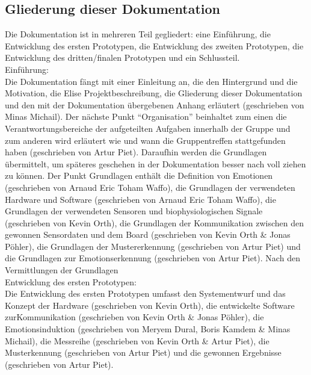 \subsection{Gliederung dieser Dokumentation} \label{gliederung-subsec}



Die Dokumentation ist in mehreren Teil gegliedert: eine Einführung, die Entwicklung des ersten Prototypen, die Entwicklung des zweiten Prototypen, die Entwicklung des dritten/finalen Prototypen und ein Schlussteil. \\

Einführung: \\

Die Dokumentation fängt mit einer Einleitung an, die den Hintergrund und die Motivation, die Elise Projektbeschreibung, die Gliederung dieser Dokumentation und den mit der Dokumentation übergebenen Anhang erläutert (geschrieben von Minas Michail). 
Der nächste Punkt ``Organisation'' beinhaltet zum einen die Verantwortungsbereiche der aufgeteilten Aufgaben innerhalb der Gruppe und  zum anderen wird erläutert wie und wann die Gruppentreffen stattgefunden haben (geschrieben von Artur Piet). 
Daraufhin werden die Grundlagen übermittelt, um späteres geschehen in der Dokumentation besser nach voll ziehen zu können. 
Der Punkt Grundlagen enthält die Definition von Emotionen (geschrieben von Arnaud Eric Toham Waffo), die Grundlagen der verwendeten Hardware und Software (geschrieben von Arnaud Eric Toham Waffo), die Grundlagen der verwendeten Sensoren und biophysiologischen Signale (geschrieben von Kevin Orth), die Grundlagen der Kommunikation zwischen den gewonnen Sensordaten und dem Board (geschrieben von Kevin Orth \& Jonas Pöhler), die Grundlagen der Mustererkennung (geschrieben von Artur Piet) und die Grundlagen zur Emotionserkennung (geschrieben von Artur Piet). 
Nach den Vermittlungen der Grundlagen \\

Entwicklung des ersten Prototypen: \\

Die Entwicklung des ersten Prototypen umfasst den Systementwurf und das Konzept der Hardware (geschrieben von Kevin Orth), die entwickelte Software zurKommunikation (geschrieben von Kevin Orth \& Jonas Pöhler), die Emotionsinduktion (geschrieben von Meryem Dural, Boris Kamdem \& Minas Michail), die Messreihe (geschrieben von Kevin Orth \& Artur Piet), die Musterkennung (geschrieben von Artur Piet) und die gewonnen Ergebnisse (geschrieben von Artur Piet). \\

